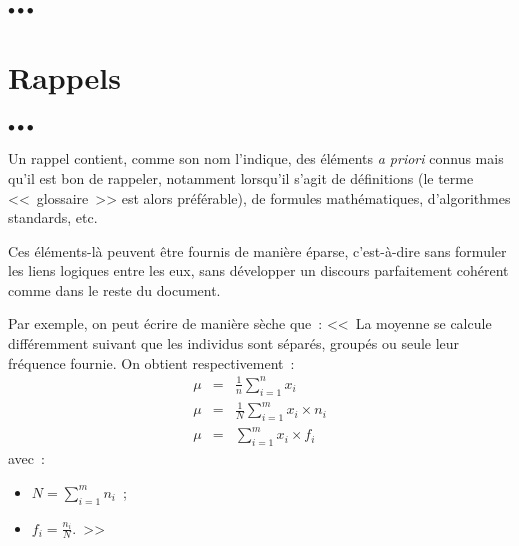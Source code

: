 \documentclass[11pt, french, screen, research-development]{report-rd-info}
\newenvironment{explanation}
{\color{blue}
 \begin{list}{}{\hspace{0.2\textwidth}\color{blue}}\item $\bullet\bullet\bullet$
}
{\end{list}}
\begin{document}
\begin{explanation}
   \bigskip

   \begin{center}
   \end{center}
\end{explanation}

\chapter{Rappels}
\label{ann:Rappels}

\begin{explanation}
   Un rappel contient, comme son nom l'indique, des éléments \emph{a priori} connus mais qu'il est bon de rappeler, notamment lorsqu'il s'agit de définitions (le terme <<~glossaire~>> est alors préférable), de formules mathématiques, d'algorithmes standards, etc.

   Ces éléments-là peuvent être fournis de manière éparse, c'est-à-dire sans formuler les liens logiques entre les eux, sans développer un discours parfaitement cohérent comme dans le reste du document.

   Par exemple, on peut écrire de manière sèche que~: <<~La moyenne se calcule différemment suivant que les individus sont séparés, groupés ou seule leur fréquence fournie.
   On obtient respectivement~:
   \begin{eqnarray}
       \mu & = & \frac{1}{n} \sum_{i=1}^n x_i\\
       \mu & = & \frac{1}{N} \sum_{i=1}^m x_i \times n_i\\
       \mu & = & \sum_{i=1}^m x_i \times f_i
   \end{eqnarray}
   avec~:
   \begin{itemize}
      \item $N = \sum_{i=1}^m n_i$~;
      \item $f_i = \frac{n_i}{N}$.~>>
   \end{itemize}
\end{explanation}
\end{document}
